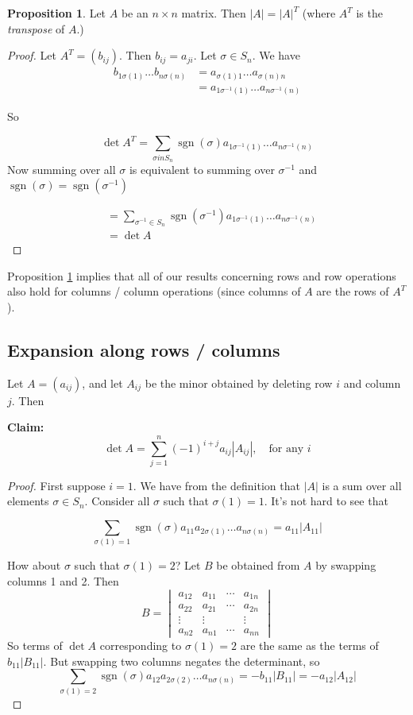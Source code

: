\documentclass{article}
\theoremstyle{definition}
\newtheorem{proposition}[theorem]{Proposition}
\newcommand{\elemt}[2]{#1_{{#2}\sigma(#2)}}
\DeclareMathOperator{\sgn}{sgn}
\begin{document}
\begin{proposition}
  \label{prp:dettran}
  Let $A$ be an $n\times n$ matrix. Then $|A| = |A|^T$  (where $A^T$
  is
  the \emph{transpose} of $A$.)
\end{proposition}

\begin{proof}
  Let $A^T = (b_{ij})$. Then $b_{ij} = a_{ji}$. Let $\sigma \in S_n$. We
  have
\begin{align*}
  \elemt{b}{1} \dots \elemt{b}{n} &= a_{\sigma(1)1} \dots a_{\sigma(n)n} \\
  &= a_{1\sigma^{-1}(1)}\dots a_{n \sigma^{-1}(n)}
\end{align*}

So 

\[
  \det A^T = \sum_{\sigma in S_n}\sgn(\sigma)  a_{1\sigma^{-1}(1)}\dots
  a_{n \sigma^{-1}(n)}
\]
Now summing over all $\sigma$ is equivalent to summing over $\sigma^{-1}$
and $\sgn(\sigma) = \sgn(\sigma^{-1})$

\begin{align*}
  &= \sum_{\sigma^{-1} \in S_n}\sgn (\sigma^{-1})a_{1\sigma^{-1}(1)}\dots
    a_{n \sigma^{-1}(n)}\\
    &= \det A
\end{align*}
\end{proof}
Proposition \ref{prp:dettran}  implies that all of our results concerning
rows and row operations
also hold for columns / column operations (since columns of $A$ are the
rows of $A^T$
).

\subsection*{Expansion along rows / columns}
Let $A = (a_{ij} )$, and let $A_{ij}$ be the minor obtained by deleting row $i$ and column
$j$. Then

\textbf{Claim:} 
\[
  \det A = \sum_{j=1}^n (-1)^{i+j}a_{ij}|A_{ij}|, \quad \text{for any } i
\]

\begin{proof}
  First suppose $i = 1$. We have from the definition that $|A|$ is a sum
  over
  all elements $\sigma \in S_n$. Consider all $\sigma$ such that
  $\sigma(1) = 1$. It's not hard to see
  that

  \[
    \sum_{\sigma(1)=1}\sgn(\sigma)a_{11}a_{2\sigma(1)}\dots a_{n\sigma(n)}
    = a_{11}|A_{11}|
  \]

  How about $\sigma$ such that $\sigma(1) = 2$? Let $B$ be obtained from $A$ by swapping columns 1 and 2. Then
  \[
  B = 
  \begin{vmatrix}
    a_{12} & a_{11} & \cdots & a_{1n} \\
    a_{22} & a_{21} & \cdots & a_{2n} \\
    \vdots & \vdots & & \vdots  \\
    a_{n2} & a_{n1} & \cdots & a_{nn}
  \end{vmatrix}
  \]
  So terms of $\det A$ corresponding to $\sigma(1) = 2$ are the same as
  the terms of  $b_{11}|B_{11}|$. But swapping two columns negates the
  determinant, so
  \[
    \sum_{\sigma(1)=2}\sgn (\sigma) a_{12}a_{2\sigma(2)} \dots a_{n\sigma(n)} = -b_{11}|B_{11}| = -a_{12}|A_{12}|
  \]
\end{proof}
 
\end{document}
